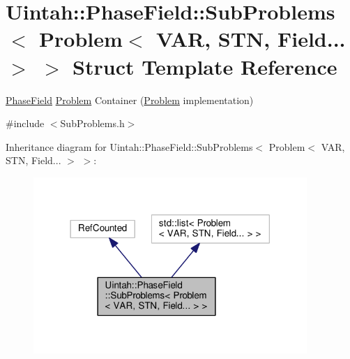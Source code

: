 \hypertarget{structUintah_1_1PhaseField_1_1SubProblems_3_01Problem_3_01VAR_00_01STN_00_01Field_8_8_8_01_4_01_4}{}\section{Uintah\+:\+:Phase\+Field\+:\+:Sub\+Problems$<$ Problem$<$ V\+AR, S\+TN, Field... $>$ $>$ Struct Template Reference}
\label{structUintah_1_1PhaseField_1_1SubProblems_3_01Problem_3_01VAR_00_01STN_00_01Field_8_8_8_01_4_01_4}


\hyperlink{namespaceUintah_1_1PhaseField}{Phase\+Field} \hyperlink{classUintah_1_1PhaseField_1_1Problem}{Problem} Container (\hyperlink{classUintah_1_1PhaseField_1_1Problem}{Problem} implementation)  




{\ttfamily \#include $<$Sub\+Problems.\+h$>$}



Inheritance diagram for Uintah\+:\+:Phase\+Field\+:\+:Sub\+Problems$<$ Problem$<$ V\+AR, S\+TN, Field... $>$ $>$\+:\nopagebreak
\begin{figure}[H]
\begin{center}
\leavevmode
\includegraphics[width=294pt]{structUintah_1_1PhaseField_1_1SubProblems_3_01Problem_3_01VAR_00_01STN_00_01Field_8_8_8_01_4_01_4__inherit__graph}
\end{center}
\end{figure}



